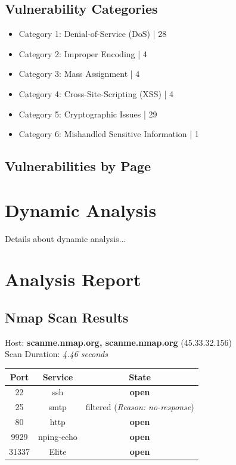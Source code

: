 \documentclass[12pt]{article}
\begin{document}
\subsection{Vulnerability Categories}
\begin{itemize}
\item Category 1: Denial-of-Service (DoS) | 28
\item Category 2: Improper Encoding | 4
\item Category 3: Mass Assignment | 4
\item Category 4: Cross-Site-Scripting (XSS) | 4
\item Category 5: Cryptographic Issues | 29
\item Category 6: Mishandled Sensitive Information | 1

\end{itemize}

\subsection{Vulnerabilities by Page}

\newpage
\section{Dynamic Analysis}
Details about dynamic analysis...

\section{Analysis Report}

\subsection*{Nmap Scan Results}
Host: \textbf{scanme.nmap.org, scanme.nmap.org} (45.33.32.156) \\
Scan Duration: \textit {4.46 seconds} \\
\begin{center}

\begin{tabular}{|c|c|c|}
\hline
\textbf{Port} & \textbf{Service} & \textbf{State} \\
\hline
22 & ssh & \textbf{open} \\
25 & smtp & filtered (\textit{Reason: no-response}) \\
80 & http & \textbf{open} \\
9929 & nping-echo & \textbf{open} \\
31337 & Elite & \textbf{open} \\
\hline
\end{tabular}
\end{center}
\end{document}
